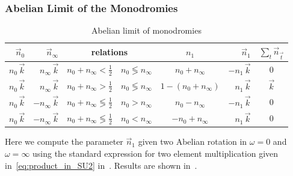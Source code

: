 \subsubsection{Abelian Limit of the \texorpdfstring{}{SU(2)} Monodromies}

\begin{table}[tbp]
  \centering
  \begin{tabular}{@{}rr|cc|cr|c@{}}
    \toprule
    $\vec{n}_{0}$                 &
    $\vec{n}_{\infty}$            &
    \multicolumn{2}{c|}{relations}    &
    $n_{1}$                      &
    $\vec{n}_{1}$                 &
    $\sum\limits_{t} \vec{n}_{\vec{t}}$
    \\
    \midrule
    $n_{0}\, \vec{k}$                        &
    $n_{\infty}\, \vec{k}$                   &
    $n_{0} + n_{\infty} < \frac{1}{2}$ &
    $n_{0} \lessgtr n_{\infty}$        &
    $n_{0} + n_{\infty}$               &
    $-n_{1}\, \vec{k}$                       &
    $0$
    \\
    $n_{0}\, \vec{k}$                        &
    $n_{\infty}\, \vec{k}$                   &
    $n_{0} + n_{\infty} > \frac{1}{2}$ &
    $n_{0} \lessgtr n_{\infty}$        &
    $1 - (n_{0} + n_{\infty})$         &
    $n_{1}\, \vec{k}$                        &
    $\vec{k}$
    \\
    $n_{0}\, \vec{k}$                               &
    $-n_{\infty}\, \vec{k}$                         &
    $n_{0} + n_{\infty} \lessgtr \frac{1}{2}$ &
    $n_{0} > n_{\infty}$                      &
    $n_{0} - n_{\infty}$                      &
    $-n_{1}\, \vec{k}$                              &
    $0$
    \\
    $n_{0}\, \vec{k}$                               &
    $-n_{\infty}\, \vec{k}$                         &
    $n_{0} + n_{\infty} \lessgtr \frac{1}{2}$ &
    $n_{0} < n_{\infty}$                      &
    $-n_{0} + n_{\infty}$                     &
    $n_{1}\, \vec{k}$                               &
    $0$
    \\
    \bottomrule
  \end{tabular}
  \caption{Abelian limit of  monodromies}
  \label{tab:Abelian_composition}
\end{table}
Here we compute the parameter $\vec{n}_{1}$ given two Abelian rotation in $\omega = 0$ and $\omega = \infty$ using the standard expression for two  element multiplication given in~\eqref{eq:product_in_SU2} in~.
Results are shown in~.

